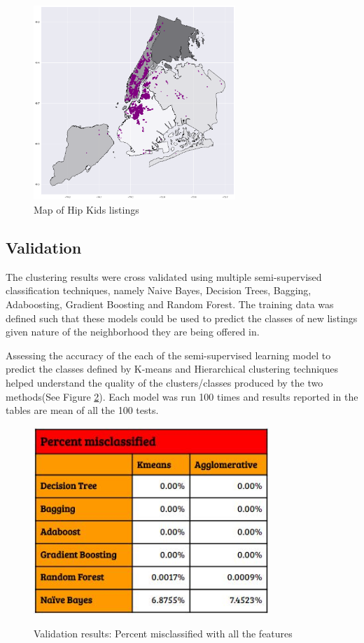 \documentclass[conference]{IEEEtran}
\begin{document}
\begin{figure}[h]
\centering
\includegraphics[width=3in]{group-4}
\caption{Map of Hip Kids listings}
\label{hipkids-map}
\end{figure}


\subsection{Validation}
The clustering results were cross validated using multiple semi-supervised classification techniques, namely Naive Bayes, Decision Trees, Bagging, Adaboosting, Gradient Boosting and Random Forest. The training data was defined such that these models could be used to predict the classes of new listings given nature of the neighborhood they are being offered in. 

Assessing the accuracy of the each of the semi-supervised learning model to predict the classes defined by K-means and Hierarchical clustering techniques helped understand the quality of the clusters/classes produced by the two methods(See Figure \ref{Validation Result table 1}). Each model was run 100 times and results reported in the tables are mean of all the 100 tests.

\begin{figure}
\centering
\caption{Validation results: Percent misclassified with all the features}
\includegraphics[width=3.5in]{ML_All_Features.JPG}
\label{Validation Result table 1}
\end{figure}
\end{document}
